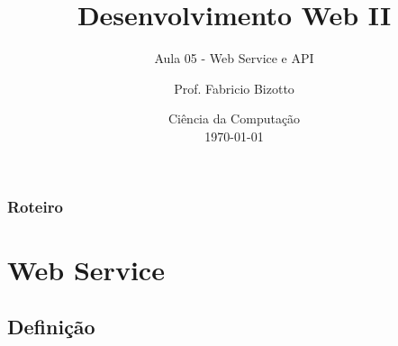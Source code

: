 \documentclass[
	10pt, %
	t, %
]{beamer}
\title[DesWebII]{Desenvolvimento Web II} %
\subtitle{Aula 05 - Web Service e API} %
\author[Fabricio Bizotto]{Prof. Fabricio Bizotto} %
\institute[IFC]{Instituto Federal Catarinense \\ \smallskip \textit{fabricio.bizotto@ifc.edu.br}} %
\date[\today]{Ciência da Computação \\ \today} %
\begin{document}

\begin{frame}
	\titlepage %
\end{frame}


\begin{frame}
	\frametitle{Roteiro} %
	
	\tableofcontents %
\end{frame}


\section{Web Service} %


\subsection{Definição}
\end{document}
